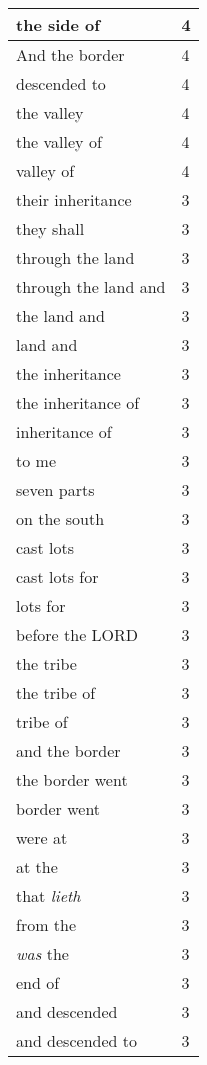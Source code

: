 \begin{center}
\begin{longtable}{|p{3.0in}|p{0.5in}|}
the side of & 4\\ \hline 
And the border & 4\\ \hline 
descended to & 4\\ \hline 
the valley & 4\\ \hline 
the valley of & 4\\ \hline 
valley of & 4\\ \hline 
their inheritance & 3\\ \hline 
they shall & 3\\ \hline 
through the land & 3\\ \hline 
through the land and & 3\\ \hline 
the land and & 3\\ \hline 
land and & 3\\ \hline 
the inheritance & 3\\ \hline 
the inheritance of & 3\\ \hline 
inheritance of & 3\\ \hline 
to me & 3\\ \hline 
seven parts & 3\\ \hline 
on the south & 3\\ \hline 
cast lots & 3\\ \hline 
cast lots for & 3\\ \hline 
lots for & 3\\ \hline 
before the LORD & 3\\ \hline 
the tribe & 3\\ \hline 
the tribe of & 3\\ \hline 
tribe of & 3\\ \hline 
and the border & 3\\ \hline 
the border went & 3\\ \hline 
border went & 3\\ \hline 
were at & 3\\ \hline 
at the & 3\\ \hline 
that \emph{lieth} & 3\\ \hline 
from the & 3\\ \hline 
\emph{was} the & 3\\ \hline 
end of & 3\\ \hline 
and descended & 3\\ \hline 
and descended to & 3\\ \hline 
\end{longtable}
\end{center}





